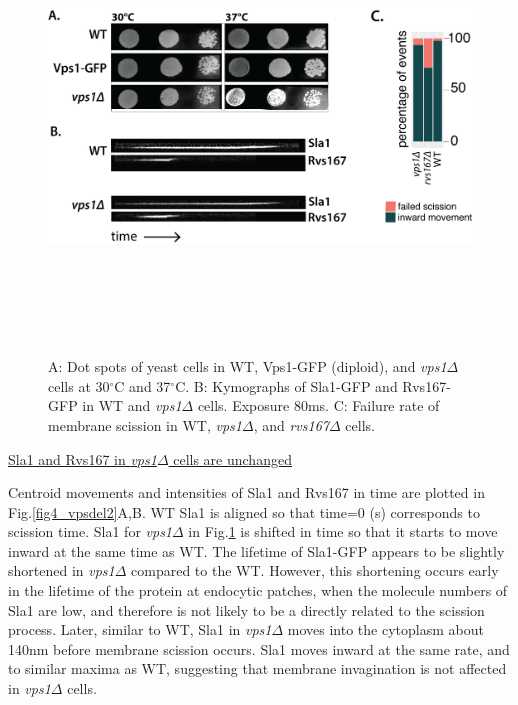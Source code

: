 \vspace{4mm}
	\begin{figure}[H]
	\centering
	\includegraphics[width=12cm,height=12cm,keepaspectratio]{figures/results_final/vps1}
	\caption[Phenotype of \textit{vps1$\Delta$}]
	{A: Dot spots of yeast cells in WT, Vps1-GFP (diploid), and \textit{vps1$\Delta$} cells at 30$^{\circ}$C and 37$^{\circ}$C. 
		B: Kymographs of Sla1-GFP and Rvs167-GFP in WT and \textit{vps1$\Delta$} cells. Exposure 80ms.  
		C: Failure rate of membrane scission in WT, \textit{vps1$\Delta$}, and \textit{rvs167$\Delta$}  cells. 
		\label{fig4_vpsdel1}}
\end{figure}



\underline{Sla1 and Rvs167 in \textit{vps1$\Delta$} cells are unchanged}

Centroid movements and intensities of Sla1 and Rvs167 in time are plotted in Fig.\ref{fig4_vpsdel2}A,B. WT Sla1 is aligned so that time=0 (s) corresponds to scission time. Sla1 for \textit{vps1$\Delta$} in Fig.\ref{fig4_vpsdel1} is shifted in time so that it starts to move inward at the same time as WT. The lifetime of Sla1-GFP appears to be slightly shortened in \textit{vps1$\Delta$} compared to the WT. However, this shortening occurs early in the lifetime of the protein at endocytic patches, when the molecule numbers of Sla1 are low, and therefore is not likely to be a directly related to the scission process. Later, similar to WT, Sla1 in \textit{vps1$\Delta$}  moves into the cytoplasm about 140nm before membrane scission occurs. Sla1 moves inward at the same rate, and to similar maxima as WT, suggesting that membrane invagination is not affected in \textit{vps1$\Delta$} cells.


